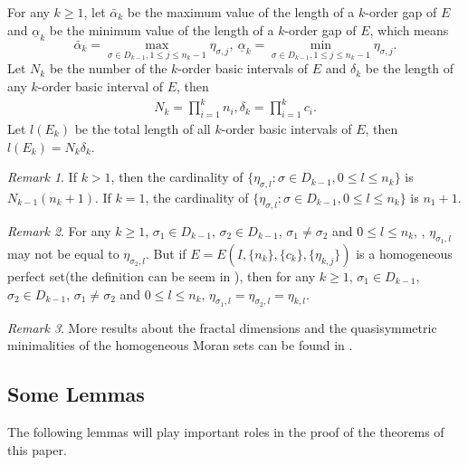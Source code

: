 \documentclass[reqno]{amsart}
\theoremstyle{plain}
\theoremstyle{definition}
\theoremstyle{remark}
\newtheorem{rem}{Remark}
\numberwithin{equation}{section} \DeclareMathOperator\intr{int}
\begin{document}
For any $k\ge 1$, let $\bar\alpha_k$ be the maximum value of the length of a $k$-order gap  of $E$ and $\underline\alpha_k$ be the minimum value of the length of a $k$-order gap of $E$, which means
$$\bar\alpha_k=\max\limits_{\sigma\in D_{k-1}, 1\leq j\leq n_k-1}\eta_{\sigma,j},\ \underline\alpha_k=\min\limits_{\sigma\in D_{k-1}, 1\leq j\leq n_k-1}\eta_{\sigma,j}.$$
Let $N_k$ be the number of the $k$-order basic intervals of $E$ and $\delta_k$ be the length of any $k$-order basic interval of $E$, then
\begin{align}
\nonumber
N_k=\prod_{i=1}^{k} n_i, \delta_k=\prod_{i=1}^{k} c_i.
\end{align}
Let $l(E_k)$ be the total length of all $k$-order basic intervals of $E$, then $l(E_k)=N_k\delta_k$.

\begin{rem}
If $k> 1$, then  the cardinality of $\{\eta_{\sigma,l}:\sigma \in D_{k-1}, 0\le l \le n_k\}$ is $N_{k-1}(n_{k}+1)$. If $k=1$,  the cardinality of $\{\eta_{\sigma,l}:\sigma \in D_{k-1}, 0\le l \le n_k\}$ is $n_1+1$.
\end{rem}

\begin{rem}\label{rm} For any  $k\ge 1$, $\sigma_1 \in D_{k-1}$, $\sigma_2 \in D_{k-1}$, $\sigma_1\ne \sigma_2$  and $0\le l \le n_k$, , $\eta_{\sigma_1,l}$ may not be equal to $\eta_{\sigma_2,l}$. But if $E=E(I,\{n_{k}\}, \{c_{k}\},\{\eta_{k,j}\})$ is a homogeneous perfect set(the definition can be seem in \cite{wzywuj05}), then for any  $k\ge 1$, $\sigma_1 \in D_{k-1}$, $\sigma_2 \in D_{k-1}$, $\sigma_1\ne \sigma_2$  and $0\le l \le n_k$, $\eta_{\sigma_1,l}=\eta_{\sigma_2,l}=\eta_{k,l}$.
\end{rem}


\begin{rem}
More results about the fractal dimensions and the quasisymmetric minimalities of the homogeneous Moran sets can be found in \cite{lss24,LW10,LW11,CWW17,LFY21,DDW23,LLY25}.

\end{rem}
\bigskip



\subsection{Some Lemmas}
The following lemmas will play important roles in the proof of the theorems of this paper.
\end{document}
